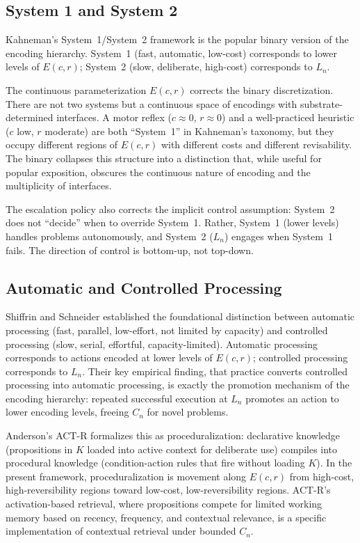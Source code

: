 \documentclass[11pt]{article}
\theoremstyle{definition}
\begin{document}
\subsection{System 1 and System 2}

Kahneman's System~1/System~2 framework \cite{Kahneman2011} is the
popular binary version of the encoding hierarchy. System~1 (fast,
automatic, low-cost) corresponds to lower levels of $E(c,r)$;
System~2 (slow, deliberate, high-cost) corresponds to $L_n$.

The continuous parameterization $E(c,r)$ corrects the binary
discretization. There are not two systems but a continuous space of
encodings with substrate-determined interfaces. A motor reflex
($c \approx 0$, $r \approx 0$) and a well-practiced heuristic
($c$ low, $r$ moderate) are both ``System~1'' in Kahneman's
taxonomy, but they occupy different regions of $E(c,r)$ with different
costs and different revisability. The binary collapses this structure
into a distinction that, while useful for popular exposition, obscures
the continuous nature of encoding and the multiplicity of interfaces.

The escalation policy also corrects the implicit control
assumption: System~2 does not ``decide'' when to override System~1.
Rather, System~1 (lower levels) handles problems autonomously, and
System~2 ($L_n$) engages when System~1 fails. The direction of
control is bottom-up, not top-down.

\subsection{Automatic and Controlled Processing}

Shiffrin and Schneider \cite{ShiffrinSchneider1977} established the
foundational distinction between automatic processing (fast, parallel,
low-effort, not limited by capacity) and controlled processing (slow,
serial, effortful, capacity-limited). Automatic processing corresponds
to actions encoded at lower levels of $E(c,r)$; controlled processing
corresponds to $L_n$. Their key empirical finding, that practice
converts controlled processing into automatic processing, is exactly
the promotion mechanism of the encoding hierarchy: repeated successful
execution at $L_n$ promotes an action to lower encoding levels, freeing
$C_n$ for novel problems.

Anderson's ACT-R \cite{Anderson1993} formalizes this as
proceduralization: declarative knowledge (propositions in $K$ loaded
into active context for deliberate use) compiles into procedural
knowledge (condition-action rules that fire without loading $K$). In
the present framework, proceduralization is movement along $E(c,r)$
from high-cost, high-reversibility regions toward low-cost,
low-reversibility regions. ACT-R's activation-based retrieval, where
propositions compete for limited working memory based on
recency, frequency, and contextual relevance, is a specific
implementation of contextual retrieval under bounded $C_n$.
\end{document}
